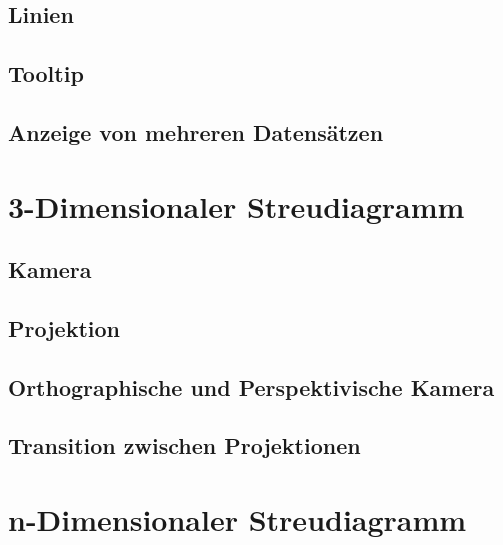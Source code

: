 \subsection{Linien}
\subsection{Tooltip}
\subsection{Anzeige von mehreren Datensätzen}

\section{3-Dimensionaler Streudiagramm}

\subsection{Kamera}
\subsection{Projektion}
\subsection{Orthographische und Perspektivische Kamera}
\subsection{Transition zwischen Projektionen}

\section{n-Dimensionaler Streudiagramm}